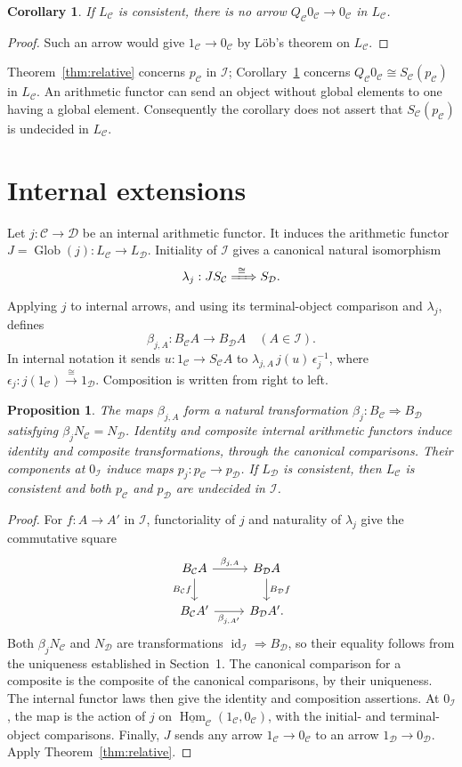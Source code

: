 \documentclass[10pt]{article}
\newtheorem{proposition}[theorem]{Proposition}
\newtheorem{corollary}[theorem]{Corollary}
\newcommand{\I}{\mathcal I}
\newcommand{\C}{\mathcal C}
\newcommand{\D}{\mathcal D}
\newcommand{\Glob}{\operatorname{Glob}}
\newcommand{\hhom}{\underline{\operatorname{Hom}}}
\begin{document}
\begin{corollary}\label{cor:internal-consistency}
If $L_\C$ is consistent, there is no arrow
$Q_\C0_\C\to0_\C$ in $L_\C$.
\end{corollary}
\begin{proof}
Such an arrow would give $1_\C\to0_\C$ by L\"ob's theorem on
$L_\C$.
\end{proof}

Theorem~\ref{thm:relative} concerns $p_\C$ in $\I$;
Corollary~\ref{cor:internal-consistency} concerns
$Q_\C0_\C\cong S_\C(p_\C)$ in $L_\C$.
An arithmetic functor can send an object without global elements
to one having a global element. Consequently the corollary does
not assert that $S_\C(p_\C)$ is undecided in $L_\C$.

\section{Internal extensions}

Let $j:\C\to\D$ be an internal arithmetic functor.
It induces the arithmetic functor
$J=\Glob(j):L_\C\to L_\D$.
Initiality of $\I$ gives a canonical natural isomorphism
\[
 \lambda_j:JS_\C\xRightarrow{\ \cong\ }S_\D.
\]
Applying $j$ to internal arrows, and using its terminal-object
comparison and $\lambda_j$, defines
\[
 \beta_{j,A}: B_\C A\longrightarrow B_\D A
 \quad(A\in\I).
\]
In internal notation it sends $u:1_\C\to S_\C A$ to
$\lambda_{j,A}\,j(u)\,\epsilon_j^{-1}$, where
$\epsilon_j:j(1_\C)\xrightarrow{\cong}1_\D$.
Composition is written from right to left.

\begin{proposition}\label{prop:extensions}
The maps $\beta_{j,A}$ form a natural transformation
$\beta_j:B_\C\Rightarrow B_\D$ satisfying
$\beta_jN_\C=N_\D$.
Identity and composite internal arithmetic functors induce identity
and composite transformations, through the canonical comparisons.
Their components at $0_\I$ induce maps
$p_j:p_\C\to p_\D$.
If $L_\D$ is consistent, then $L_\C$ is consistent and both
$p_\C$ and $p_\D$ are undecided in $\I$.
\end{proposition}
\begin{proof}
For $f:A\to A'$ in $\I$, functoriality of $j$ and naturality
of $\lambda_j$ give the commutative square
\[
\begin{tikzcd}
B_\C A\arrow[r,"\beta_{j,A}"]\arrow[d,"B_\C f"']&
B_\D A\arrow[d,"B_\D f"]\\
B_\C A'\arrow[r,"\beta_{j,A'}"']&B_\D A'.
\end{tikzcd}
\]
Both $\beta_jN_\C$ and $N_\D$ are transformations
$\operatorname{id}_\I\Rightarrow B_\D$, so their equality follows from
the uniqueness established in Section~1.
The canonical comparison for a composite is the composite of
the canonical comparisons, by their uniqueness. The internal
functor laws then give the identity and composition assertions.
At $0_\I$, the map is the action of $j$ on
$\hhom_\C(1_\C,0_\C)$, with the initial- and terminal-object
comparisons. Finally, $J$ sends any arrow $1_\C\to0_\C$ to
an arrow $1_\D\to0_\D$. Apply Theorem~\ref{thm:relative}.
\end{proof}
\end{document}
